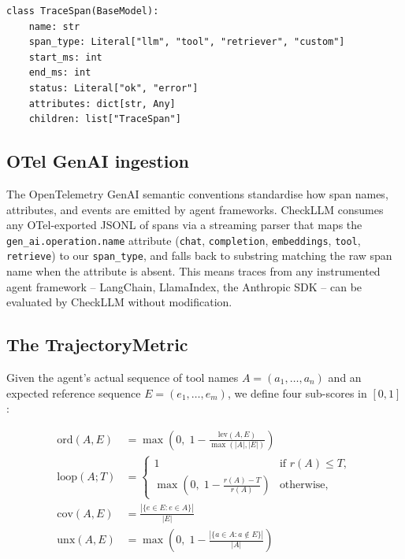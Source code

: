 \documentclass{article}
\begin{document}
\begin{lstlisting}[basicstyle=\small\ttfamily, frame=single, columns=fullflexible]
class TraceSpan(BaseModel):
    name: str
    span_type: Literal["llm", "tool", "retriever", "custom"]
    start_ms: int
    end_ms: int
    status: Literal["ok", "error"]
    attributes: dict[str, Any]
    children: list["TraceSpan"]
\end{lstlisting}

\subsection{OTel GenAI ingestion}
\label{subsec:otel}
The OpenTelemetry GenAI semantic conventions \citep{otelgenai2024}
standardise how span names, attributes, and events are emitted by
agent frameworks. CheckLLM consumes any OTel-exported JSONL of spans
via a streaming parser that maps the \texttt{gen\_ai.operation.name}
attribute (\texttt{chat}, \texttt{completion}, \texttt{embeddings},
\texttt{tool}, \texttt{retrieve}) to our \texttt{span\_type}, and falls
back to substring matching the raw span name when the attribute is
absent. This means traces from any instrumented agent framework --
LangChain, LlamaIndex, the Anthropic SDK -- can be evaluated by
CheckLLM without modification.

\subsection{The TrajectoryMetric}
\label{subsec:metric}

Given the agent's actual sequence of tool names $A=(a_1,\dots,a_n)$
and an expected reference sequence $E=(e_1,\dots,e_m)$, we define
four sub-scores in $[0,1]$:

\begin{align}
\text{ord}(A,E) &= \max\!\left(0,\;1 - \frac{\mathrm{lev}(A,E)}{\max(|A|,|E|)}\right)
\label{eq:ord}\\
\text{loop}(A;T) &=
\begin{cases}
1 & \text{if } r(A) \le T,\\
\max\!\left(0,\;1 - \frac{r(A)-T}{r(A)}\right) & \text{otherwise,}
\end{cases}
\label{eq:loop}\\
\text{cov}(A,E) &= \frac{|\{e \in E : e \in A\}|}{|E|}
\label{eq:cov}\\
\text{unx}(A,E) &= \max\!\left(0,\;1 - \frac{|\{a \in A : a \notin E\}|}{|A|}\right)
\label{eq:unx}
\end{align}
\end{document}
